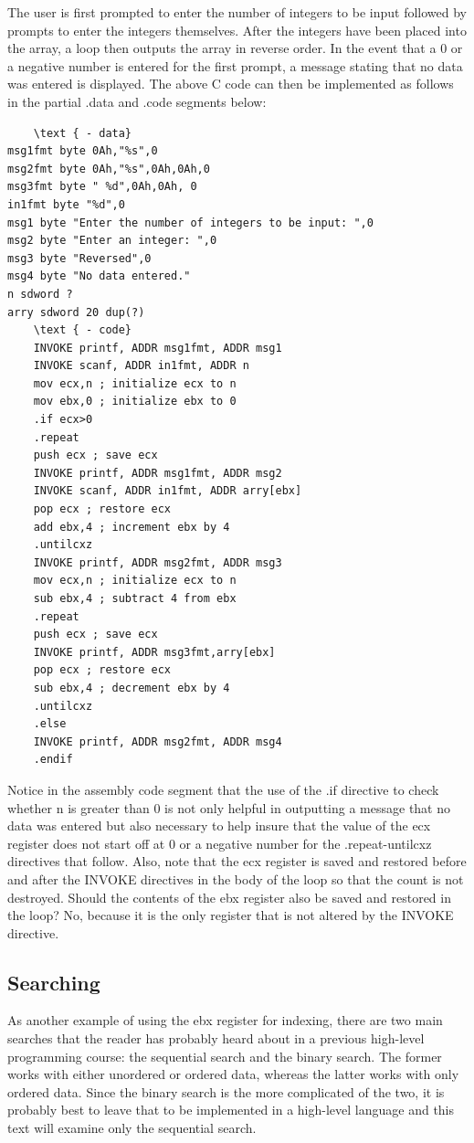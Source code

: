 \documentclass[10pt]{article}
\begin{document}
The user is first prompted to enter the number of integers to be input followed by prompts to enter the integers themselves. After the integers have been placed into the array, a loop then outputs the array in reverse order. In the event that a 0 or a negative number is entered for the first prompt, a message stating that no data was entered is displayed. The above C code can then be implemented as follows in the partial .data and .code segments below:

\begin{verbatim}
    \text { - data}
msg1fmt byte 0Ah,"%s",0
msg2fmt byte 0Ah,"%s",0Ah,0Ah,0
msg3fmt byte " %d",0Ah,0Ah, 0
in1fmt byte "%d",0
msg1 byte "Enter the number of integers to be input: ",0
msg2 byte "Enter an integer: ",0
msg3 byte "Reversed",0
msg4 byte "No data entered."
n sdword ?
arry sdword 20 dup(?)
    \text { - code}
    INVOKE printf, ADDR msg1fmt, ADDR msg1
    INVOKE scanf, ADDR in1fmt, ADDR n
    mov ecx,n ; initialize ecx to n
    mov ebx,0 ; initialize ebx to 0
    .if ecx>0
    .repeat
    push ecx ; save ecx
    INVOKE printf, ADDR msg1fmt, ADDR msg2
    INVOKE scanf, ADDR in1fmt, ADDR arry[ebx]
    pop ecx ; restore ecx
    add ebx,4 ; increment ebx by 4
    .untilcxz
    INVOKE printf, ADDR msg2fmt, ADDR msg3
    mov ecx,n ; initialize ecx to n
    sub ebx,4 ; subtract 4 from ebx
    .repeat
    push ecx ; save ecx
    INVOKE printf, ADDR msg3fmt,arry[ebx]
    pop ecx ; restore ecx
    sub ebx,4 ; decrement ebx by 4
    .untilcxz
    .else
    INVOKE printf, ADDR msg2fmt, ADDR msg4
    .endif
\end{verbatim}

Notice in the assembly code segment that the use of the .if directive to check whether n is greater than 0 is not only helpful in outputting a message that no data was entered but also necessary to help insure that the value of the ecx register does not start off at 0 or a negative number for the .repeat-untilcxz directives that follow. Also, note that the ecx register is saved and restored before and after the INVOKE directives in the body of the loop so that the count is not destroyed. Should the contents of the ebx register also be saved and restored in the loop? No, because it is the only register that is not altered by the INVOKE directive.

\subsection*{Searching}
As another example of using the ebx register for indexing, there are two main searches that the reader has probably heard about in a previous high-level programming course: the sequential search and the binary search. The former works with either unordered or ordered data, whereas the latter works with only ordered data. Since the binary search is the more complicated of the two, it is probably best to leave that to be implemented in a high-level language and this text will examine only the sequential search.
\end{document}
